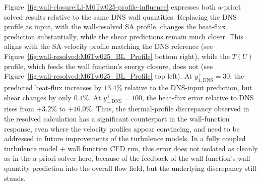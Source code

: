 Figure~\ref{fig:wall-closure:Li-M6Tw025-profile-influence} expresses both a-priori solved results relative to the same DNS wall quantities. Replacing the DNS profile as input, with the wall-resolved SA profile, changes the heat-flux prediction substantially, while the shear predictions remain much closer. This aligns with the SA velocity profile matching the DNS reference (see Figure~\ref{fig:wall-resolved:M6Tw025_BL_Profile} bottom right), while the \(T(U)\) profile, which feeds the wall function's energy closure, does not (see Figure~\ref{fig:wall-resolved:M6Tw025_BL_Profile} top left). At \(y_{1,\mathrm{DNS}}^+=30\), the predicted heat-flux increases by \(13.4\%\) relative to the DNS-input prediction, but shear changes by only \(0.1\%\). At \(y_{1,\mathrm{DNS}}^+=100\), the heat-flux error relative to DNS rises from \(+3.2\%\) to \(+16.0\%\). Thus, the thermal-profile discrepancy observed in the resolved calculation has a significant counterpart in the wall-function response, even where the velocity profiles appear convincing, and need to be addressed in future improvements of the turbulence models. In a fully coupled turbulence model + wall function CFD run, this error does not isolated as cleanly as in the a-priori solver here, because of the feedback of the wall function's wall quantity prediction into the overall flow field, but the underlying discrepancy still stands.

